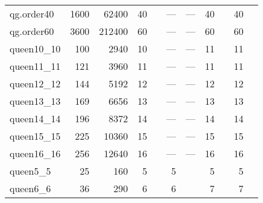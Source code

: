 \begin{table}[t]
\begin{tabular}{lrrrlrlrlrl}
  qg.order40 & 1600 & 62400 & 40 & \cite{Malaguti2011} & --- & --- & 40 & \cite{Malaguti2010,Mendez-Diaz2006,Mendez-Diaz2006,Malaguti2011} & 40 & \cite{Malaguti2010,Malaguti2011,Wu2013a,Segundo2012,Sewell1996} \\ 
  qg.order60 & 3600 & 212400 & 60 & \cite{Malaguti2011} & --- & --- & 60 & \cite{Malaguti2010,Mendez-Diaz2006,Mendez-Diaz2006,Malaguti2011} & 60 & \cite{Malaguti2010,Malaguti2011,Wu2013a,Sewell1996} \\ 
  queen10\_10 & 100 & 2940 & 10 & \cite{Malaguti2011} & --- & --- & 11 & \cite{Malaguti2010,Malaguti2011} & 11 & \cite{Malaguti2010,Malaguti2011,Gualandi2012,Zhou2016} \\ 
  queen11\_11 & 121 & 3960 & 11 & \cite{Malaguti2011} & --- & --- & 11 & \cite{Malaguti2010,Malaguti2011,Gualandi2012,Mendez-Diaz2006} & 11 & \cite{Malaguti2010,Malaguti2011,Gualandi2012} \\ 
  queen12\_12 & 144 & 5192 & 12 & \cite{Malaguti2011} & --- & --- & 12 & \cite{Malaguti2010,Malaguti2011,Mendez-Diaz2006} & 12 & \cite{Malaguti2010,Malaguti2011} \\ 
  queen13\_13 & 169 & 6656 & 13 & \cite{Malaguti2011} & --- & --- & 13 & \cite{Malaguti2010,Malaguti2011,Mendez-Diaz2006,Brelaz1979,Sewell1996,Segundo2012} & 13 & \cite{Malaguti2010,Malaguti2011} \\ 
  queen14\_14 & 196 & 8372 & 14 & \cite{Malaguti2011} & --- & --- & 14 & \cite{Malaguti2010,Malaguti2011,Mendez-Diaz2006,Brelaz1979,Sewell1996,Segundo2012} & 14 & \cite{Malaguti2010,Malaguti2011} \\ 
  queen15\_15 & 225 & 10360 & 15 & \cite{Malaguti2011} & --- & --- & 15 & \cite{Malaguti2010,Malaguti2011,Mendez-Diaz2006,Brelaz1979,Sewell1996,Segundo2012} & 15 & \cite{Malaguti2010,Malaguti2011} \\ 
  queen16\_16 & 256 & 12640 & 16 & \cite{Malaguti2011} & --- & --- & 16 & \cite{Malaguti2010,Malaguti2011,Mendez-Diaz2006,Brelaz1979,Sewell1996,Segundo2012} & 16 & \cite{Malaguti2010,Malaguti2011} \\ 
  queen5\_5 & 25 & 160 & 5 & \cite{Malaguti2011,Gualandi2012} & 5 & \cite{Gualandi2012} & 5 & \cite{Mehrotra1996,Mehrotra1996,Gualandi2012} & 5 & \cite{Mehrotra1996,Mehrotra1996,Wu2013a,Gualandi2012,Zhou2016} \\ 
  queen6\_6 & 36 & 290 & 6 & \cite{Malaguti2011,Gualandi2012} & 6 & \cite{Gualandi2012} & 7 & \cite{Mehrotra1996,Mehrotra1996,Gualandi2012} & 7 & \cite{Mehrotra1996,Mehrotra1996,Wu2013a,Gualandi2012,Zhou2016} \\ 

\end{tabular}
\end{table}
